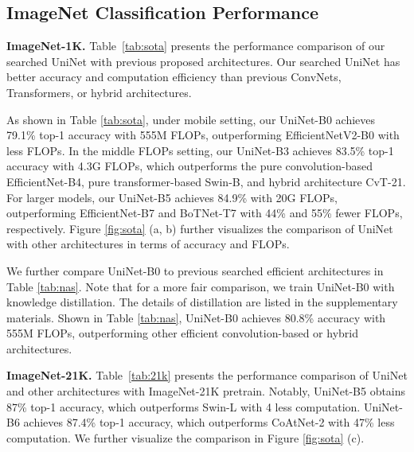 \documentclass[runningheads]{llncs}
\begin{document}
\subsection{ImageNet Classification Performance}
\noindent\textbf{ImageNet-1K.} Table~\ref{tab:sota} presents the performance comparison of our searched UniNet with previous proposed architectures. Our searched UniNet has better accuracy and computation efficiency than previous ConvNets, Transformers, or hybrid architectures. 

As shown in Table \ref{tab:sota}, under mobile setting, our UniNet-B0 achieves 79.1\% top-1 accuracy with 555M FLOPs, outperforming EfficientNetV2-B0 \cite{effnetv2} with less FLOPs. In the middle FLOPs setting, our UniNet-B3 achieves 83.5\% top-1 accuracy with 4.3G FLOPs, which outperforms the pure convolution-based EfficientNet-B4, pure transformer-based Swin-B, and hybrid architecture CvT-21. For larger models, our UniNet-B5 achieves 84.9\% with 20G FLOPs, outperforming EfficientNet-B7 and BoTNet-T7 with 44\% and 55\% fewer FLOPs, respectively. Figure \ref{fig:sota} (a, b) further visualizes the comparison of UniNet with other architectures in terms of accuracy and FLOPs. 

We further compare UniNet-B0 to previous searched efficient architectures in Table \ref{tab:nas}. Note that for a more fair comparison, we train UniNet-B0 with knowledge distillation. The details of distillation are listed in the supplementary materials. Shown in Table \ref{tab:nas}, UniNet-B0 achieves 80.8\% accuracy with 555M FLOPs, outperforming other efficient convolution-based or hybrid architectures.


\noindent\textbf{ImageNet-21K.} Table~\ref{tab:21k} presents the performance comparison of UniNet and other architectures with ImageNet-21K pretrain. Notably, UniNet-B5 obtains 87\% top-1 accuracy, which outperforms Swin-L with 4 less computation. UniNet-B6 achieves 87.4\% top-1 accuracy, which outperforms CoAtNet-2 \cite{coatnet} with 47\% less computation. We further visualize the comparison in Figure \ref{fig:sota} (c). 
\end{document}
